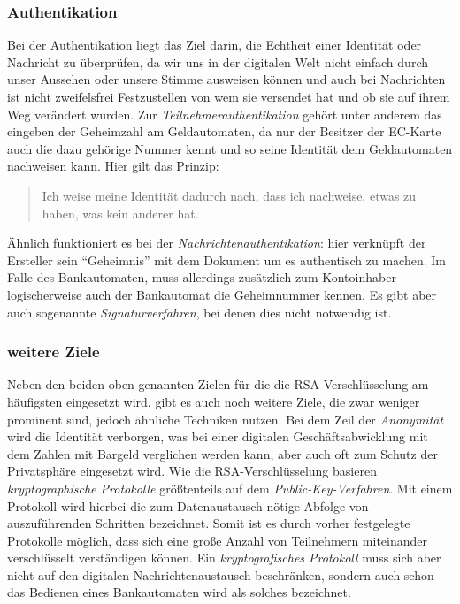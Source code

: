 \documentclass{scrarticle} %
\begin{document}
    \subsubsection{Authentikation}
    Bei der Authentikation liegt das Ziel darin, die Echtheit einer Identität oder Nachricht zu überprüfen, da wir uns in der digitalen Welt nicht einfach durch unser Aussehen oder unsere Stimme ausweisen können und auch bei Nachrichten ist nicht zweifelsfrei Festzustellen von wem sie versendet hat und ob sie auf ihrem Weg verändert wurden. Zur \emph{Teilnehmerauthentikation} gehört unter anderem das eingeben der Geheimzahl am Geldautomaten, da nur der Besitzer der EC-Karte auch die dazu gehörige Nummer kennt und so seine Identität dem Geldautomaten nachweisen kann. Hier gilt das Prinzip:
    \begin{quote}
        Ich weise meine Identität dadurch nach, dass ich nachweise, etwas zu haben, was kein anderer hat.\autocite{beutelspacher2015}
    \end{quote}
    Ähnlich funktioniert es bei der \emph{Nachrichtenauthentikation}: hier verknüpft der Ersteller sein \enquote{Geheimnis} mit dem Dokument um es authentisch zu machen. Im Falle des Bankautomaten, muss allerdings zusätzlich zum Kontoinhaber logischerweise auch der Bankautomat die Geheimnummer kennen. Es gibt aber auch sogenannte \emph{Signaturverfahren}, bei denen dies nicht notwendig ist.
    \subsubsection{weitere Ziele}
    Neben den beiden oben genannten Zielen für die die RSA-Verschlüsselung am häufigsten eingesetzt wird, gibt es auch noch weitere Ziele, die zwar weniger prominent sind, jedoch ähnliche Techniken nutzen. Bei dem Zeil der \emph{Anonymität} wird die Identität verborgen, was bei einer digitalen Geschäftsabwicklung mit dem Zahlen mit Bargeld verglichen werden kann, aber auch oft zum Schutz der Privatsphäre eingesetzt wird. Wie die RSA-Verschlüsselung basieren \emph{kryptographische Protokolle} größtenteils auf dem \emph{Public-Key-Verfahren}. Mit einem Protokoll wird hierbei die zum Datenaustausch nötige Abfolge von auszuführenden Schritten bezeichnet. Somit ist es durch vorher festgelegte Protokolle möglich, dass sich eine große Anzahl von Teilnehmern miteinander verschlüsselt verständigen können. Ein \emph{kryptografisches Protokoll} muss sich aber nicht auf den digitalen Nachrichtenaustausch beschränken, sondern auch schon das Bedienen eines Bankautomaten wird als solches bezeichnet.
\end{document}
